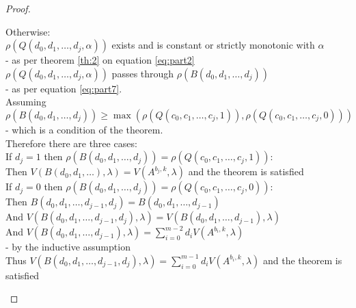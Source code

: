 \begin{proof}
\begin{itemize}[leftmargin=*,labelsep=4mm]
\-\hspace{4mm}Otherwise:\\
\-\hspace{8mm}$\rho(Q(d_0,d_1,\dots,d_{j},\alpha))$ exists and is constant or strictly monotonic with $\alpha$\\
\-\hspace{8mm}- as per theorem \ref{th:2} on equation \ref{eq:part2}\\
\-\hspace{8mm}$\rho(Q(d_0,d_1,\dots,d_{j},\alpha))$ passes through $\rho(B(d_0,d_1,\dots,d_{j}))$\\
\-\hspace{8mm}- as per equation \ref{eq:part7}.\\
\-\hspace{8mm}Assuming $\rho(B(d_0,d_1,\dots,d_{j}))\ge\max(\rho(Q(c_0,c_1,\dots,c_{j},1)), \rho(Q(c_0,c_1,\dots,c_{j},0)))$\\
\-\hspace{8mm}- which is a condition of the theorem.\\
\-\hspace{8mm}Therefore there are three cases:\\
\-\hspace{12mm}If $d_j=1$ then $\rho(B(d_0,d_1,\dots,d_{j}))=\rho(Q(c_0,c_1,\dots,c_{j},1))$:\\
\-\hspace{16mm}Then $V(B(d_0,d_1,\dots),\lambda) = V(A^{b_j,k},\lambda)$ and the theorem is satisfied\\
\-\hspace{12mm}If $d_j=0$ then $\rho(B(d_0,d_1,\dots,d_{j}))=\rho(Q(c_0,c_1,\dots,c_{j},0))$: \\
\-\hspace{16mm}Then $B(d_0,d_1,\dots,d_{j-1},d_{j})=B(d_0,d_1,\dots,d_{j-1})$\\
\-\hspace{16mm}And $V(B(d_0,d_1,\dots,d_{j-1},d_{j}),\lambda) = V(B(d_0,d_1,\dots,d_{j-1}),\lambda)$\\
\-\hspace{16mm}And $V(B(d_0,d_1,\dots,d_{j-1}),\lambda) = \sum_{i=0}^{m-2}d_iV(A^{b_i,k},\lambda)$\\
\-\hspace{16mm}- by the inductive assumption\\
\-\hspace{16mm}Thus $V(B(d_0,d_1,\dots,d_{j-1},d_{j}),\lambda) = \sum_{i=0}^{m-1}d_iV(A^{b_i,k},\lambda)$ and the theorem is satisfied\\

\end{itemize}
\end{proof}

